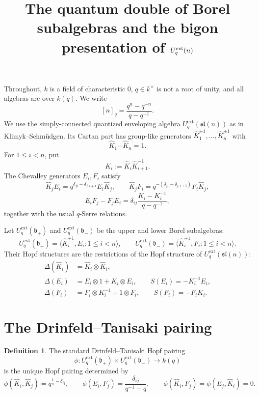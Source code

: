 \documentclass[11pt]{article}
\title{The quantum double of Borel subalgebras and the bigon presentation of $\Uq(n)$}
\author{}
\date{}
\theoremstyle{definition}
\newtheorem{definition}{Definition}
\newcommand{\Uq}{U_q^{\mathrm{ext}}}
\newcommand{\slie}{\mathfrak{sl}}
\newcommand{\fb}{\mathfrak{b}}
\newcommand{\KK}{\hat K}
\begin{document}
\maketitle

Throughout, $k$ is a field of characteristic $0$, $q\in k^\times$ is not a root of unity,
and all algebras are over $k(q)$. We write
\[
[n]_q=\frac{q^n-q^{-n}}{q-q^{-1}}.
\]
We use the simply-connected quantized enveloping algebra $\Uq(\slie(n))$ as in
Klimyk--Schm\"udgen. Its Cartan part has group-like generators
$\KK_1^{\pm1},\dots,\KK_n^{\pm1}$ with
\[
\KK_1\cdots \KK_n=1.
\]
For $1\le i<n$, put
\[
K_i:=\KK_i \KK_{i+1}^{-1}.
\]
The Chevalley generators $E_i,F_i$ satisfy
\begin{equation}
  \KK_j E_i=q^{\delta_{ji}-\delta_{j,i+1}}E_i \KK_j,\qquad
  \KK_j F_i=q^{-(\delta_{ji}-\delta_{j,i+1})}F_i \KK_j,
\end{equation}
\begin{equation}
  E_iF_j-F_jE_i=\delta_{ij}\frac{K_i-K_i^{-1}}{q-q^{-1}},
\end{equation}
together with the usual $q$-Serre relations.

Let $\Uq(\fb_+)$ and $\Uq(\fb_-)$ be the upper and lower Borel subalgebras:
\[
\Uq(\fb_+)=\bigl\langle \KK_i^{\pm1}, E_i : 1\le i<n\bigr\rangle,\qquad
\Uq(\fb_-)=\bigl\langle \KK_i^{\pm1}, F_i : 1\le i<n\bigr\rangle.
\]
Their Hopf structures are the restrictions of the Hopf structure of $\Uq(\slie(n))$:
\begin{align*}
\Delta(\KK_i)&=\KK_i\otimes \KK_i,\\
\Delta(E_i)&=E_i\otimes 1+K_i\otimes E_i,\qquad S(E_i)=-K_i^{-1}E_i,\\
\Delta(F_i)&=F_i\otimes K_i^{-1}+1\otimes F_i,\qquad S(F_i)=-F_iK_i.
\end{align*}

\section{The Drinfeld--Tanisaki pairing}

\begin{definition}
The standard Drinfeld--Tanisaki Hopf pairing
\[
\phi:\Uq(\fb_+)\times \Uq(\fb_-)\longrightarrow k(q)
\]
is the unique Hopf pairing determined by
\begin{equation}
\label{eq:pairing}
\phi(\KK_i,\KK_j)=q^{\frac1n-\delta_{ij}},\qquad
\phi(E_i,F_j)=\frac{\delta_{ij}}{q^{-1}-q},\qquad
\phi(\KK_i,F_j)=\phi(E_j,\KK_i)=0.
\end{equation}
\end{definition}
\end{document}
